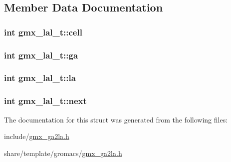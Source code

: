\subsection{\-Member \-Data \-Documentation}
\hypertarget{structgmx__lal__t_a875850be535304b378d87e9ed3f82a27}{
\subsubsection[{cell}]{\setlength{\rightskip}{0pt plus 5cm}int {\bf gmx\-\_\-lal\-\_\-t\-::cell}}}\label{structgmx__lal__t_a875850be535304b378d87e9ed3f82a27}
\hypertarget{structgmx__lal__t_ab71d344a09371c91d6f4513a27fd6dd6}{
\subsubsection[{ga}]{\setlength{\rightskip}{0pt plus 5cm}int {\bf gmx\-\_\-lal\-\_\-t\-::ga}}}\label{structgmx__lal__t_ab71d344a09371c91d6f4513a27fd6dd6}
\hypertarget{structgmx__lal__t_a5e7573b886bc78f23e02860b00da9dfe}{
\subsubsection[{la}]{\setlength{\rightskip}{0pt plus 5cm}int {\bf gmx\-\_\-lal\-\_\-t\-::la}}}\label{structgmx__lal__t_a5e7573b886bc78f23e02860b00da9dfe}
\hypertarget{structgmx__lal__t_aa27b7ed8513370ab4c29a5425ee2e638}{
\subsubsection[{next}]{\setlength{\rightskip}{0pt plus 5cm}int {\bf gmx\-\_\-lal\-\_\-t\-::next}}}\label{structgmx__lal__t_aa27b7ed8513370ab4c29a5425ee2e638}


\-The documentation for this struct was generated from the following files\-:\begin{DoxyCompactItemize}
\item 
include/\hyperlink{include_2gmx__ga2la_8h}{gmx\-\_\-ga2la.\-h}\item 
share/template/gromacs/\hyperlink{share_2template_2gromacs_2gmx__ga2la_8h}{gmx\-\_\-ga2la.\-h}\end{DoxyCompactItemize}
